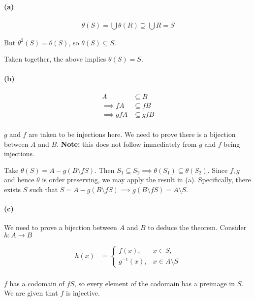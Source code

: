 \documentclass{article}
\begin{document}
\paragraph{(a)}

\begin{align*}
  \theta(S) = \bigcup \theta(R) \supseteq \bigcup R = S
\end{align*}

But $\theta^2(S) = \theta(S)$, so $\theta(S) \subseteq S$.

Taken together, the above implies $\theta(S) = S$.

\paragraph{(b)}
\begin{align*}
  A &\subseteq B \\
  \implies fA &\subseteq fB \\
  \implies gfA &\subseteq gfB \\
\end{align*}

$g$ and $f$ are taken to be injections here. We need to prove there is a bijection between $A$ and $B$. \textbf{Note:} this does not follow immediately from $g$
and $f$ being injections.

Take $\theta(S) = A - g(B \setminus fS)$. Then $S_1 \subseteq S_2 \implies \theta(S_1) \subseteq \theta(S_2)$. Since $f, g$ and hence $\theta$ is order preserving, we may apply the result in (a). Specifically, there exists $S$ such that $S = A - g(B \setminus fS) \implies g(B \setminus fS) = A \setminus S$.

\paragraph{(c)}

We need to prove a bijection between $A$ and $B$ to deduce the theorem. Consider $h\colon A \rightarrow B$

\begin{align*}
  h(x) &= \begin{cases}
    f(x), & x \in S,  \\
    g^{-1}(x), & x \in A \setminus S
  \end{cases} \\
\end{align*}

$f$ has a codomain of $fS$, so every element of the codomain has a preimage in $S$. We are given that $f$ is injective.
\end{document}
